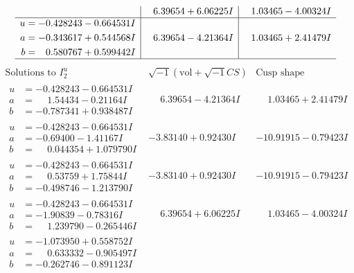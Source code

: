 \documentclass[1p]{elsarticle_modified}
\theoremstyle{definition}
\newcommand{\I}{\sqrt{-1}}
\begin{document}
$$\begin{array}{c|c|c}
 & \phantom{-}6.39654 + 6.06225 I & \phantom{-}1.03465 - 4.00324 I \\ \hline\begin{aligned}
u &= -0.428243 - 0.664531 I \\
a &= -0.343617 + 0.544568 I \\
b &= \phantom{-}0.580767 + 0.599442 I\end{aligned}
 & \phantom{-}6.39654 - 4.21364 I & \phantom{-}1.03465 + 2.41479 I\\
 \hline 
 \end{array}$$\newpage$$\begin{array}{c|c|c}  
\text{Solutions to }I^u_{2}& \I (\text{vol} + \sqrt{-1}CS) & \text{Cusp shape}\\
 \hline 
\begin{aligned}
u &= -0.428243 - 0.664531 I \\
a &= \phantom{-}1.54434 - 0.21164 I \\
b &= -0.787341 + 0.938487 I\end{aligned}
 & \phantom{-}6.39654 - 4.21364 I & \phantom{-}1.03465 + 2.41479 I \\ \hline\begin{aligned}
u &= -0.428243 - 0.664531 I \\
a &= -0.69400 - 1.41167 I \\
b &= \phantom{-}0.044354 + 1.079790 I\end{aligned}
 & -3.83140 + 0.92430 I & -10.91915 - 0.79423 I \\ \hline\begin{aligned}
u &= -0.428243 - 0.664531 I \\
a &= \phantom{-}0.53759 + 1.75844 I \\
b &= -0.498746 - 1.213790 I\end{aligned}
 & -3.83140 + 0.92430 I & -10.91915 - 0.79423 I \\ \hline\begin{aligned}
u &= -0.428243 - 0.664531 I \\
a &= -1.90839 - 0.78316 I \\
b &= \phantom{-}1.239790 - 0.265446 I\end{aligned}
 & \phantom{-}6.39654 + 6.06225 I & \phantom{-}1.03465 - 4.00324 I \\ \hline\begin{aligned}
u &= -1.073950 + 0.558752 I \\
a &= \phantom{-}0.633332 - 0.905497 I \\
b &= -0.262746 - 0.891123 I\end{aligned}

\end{array}$$
\end{document}
